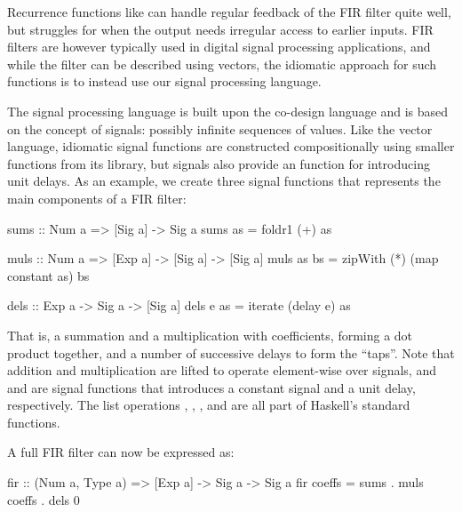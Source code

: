 \documentclass[../main.tex]{subfiles}
\begin{document}
Recurrence functions like  can handle regular feedback of the FIR filter quite well, but struggles for when the output needs irregular access to earlier inputs. FIR filters are however typically used in digital signal processing applications, and while the filter can be described using vectors, the idiomatic approach for such functions is to instead use our signal processing language. 

The signal processing language is built upon the co-design language and is based on the concept of signals: possibly infinite sequences of values. Like the vector language, idiomatic signal functions are constructed compositionally using smaller functions from its library, but signals also provide an function for introducing unit delays. As an example, we create three signal functions that represents the main components of a FIR filter:

\begin{code}
sums :: Num a => [Sig a] -> Sig a
sums as = foldr1 (+) as

muls :: Num a => [Exp a] -> [Sig a] -> [Sig a]
muls as bs = zipWith (*) (map constant as) bs

dels :: Exp a -> Sig a -> [Sig a]
dels e as = iterate (delay e) as
\end{code}

\noindent That is, a summation and a multiplication with coefficients, forming a dot product together, and a number of successive delays to form the ``taps''. Note that addition and multiplication are lifted to operate element-wise over signals, and  and  are signal functions that introduces a constant signal and a unit delay, respectively. The list operations , , , and  are all part of Haskell's standard functions.

A full FIR filter can now be expressed as:

\begin{code}
fir :: (Num a, Type a) => [Exp a] -> Sig a -> Sig a
fir coeffs = sums . muls coeffs . dels 0
\end{code}


\end{document}
